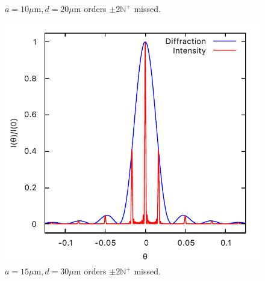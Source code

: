 \documentclass[11pt, twoside]{article}   	%
\theoremstyle{plain}
\theoremstyle{definition}
\begin{document}
\begin{description}
\begin{figure}[htbp]
\begin{minipage}[t]{0.33\linewidth}
		\caption{\centering $a = 10\mu\mathrm{m}, d = 20\mu\mathrm{m}$
			\newline orders $\pm 2\mathbb N^+$ missed.}
		\end{minipage}
		\begin{minipage}[t]{0.33\linewidth}
		\centering
		\includegraphics[width=0.9\linewidth]{15-30}
		\caption{\centering $a = 15\mu\mathrm{m}, d = 30\mu\mathrm{m}$
			\newline orders $\pm 2\mathbb N^+$ missed.}
		\end{minipage}
		\medskip


\end{figure}
\end{description}
\end{document}
